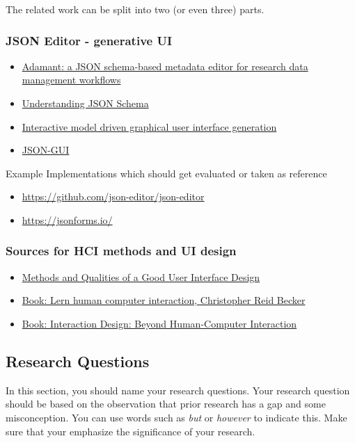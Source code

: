 The related work can be split into two (or even three) parts.

\subsubsection{JSON Editor - generative UI}

\begin{itemize}
	\item \href{https://f1000research.com/articles/11-475}{Adamant: a JSON schema-based metadata editor for research data management workflows}
	\item \href{https://json-schema.org/understanding-json-schema/UnderstandingJSONSchema.pdf}{Understanding JSON Schema}
	\item \href{https://www.researchgate.net/publication/220728636_Interactive_model_driven_graphical_user_interface_generation}{Interactive model driven graphical user interface generation }
	\item \href{https://www.sciencedirect.com/science/article/pii/S2352711018300505}{JSON-GUI}
\end{itemize}

Example Implementations which should get evaluated or taken as reference
\begin{itemize}
	\item \url{https://github.com/json-editor/json-editor}
	\item \url{https://jsonforms.io/}
\end{itemize}



\subsubsection{Sources for HCI methods and UI design}

\begin{itemize}
	\item \href{https://www.diva-portal.org/smash/get/diva2:215020/FULLTEXT01.pdf }{Methods and Qualities of a Good User Interface Design}
	\item \href{}{Book: Lern human computer interaction, Christopher Reid Becker}
	\item \href{}{Book: Interaction Design: Beyond Human-Computer Interaction }
\end{itemize}

\subsection{Research Questions}
\label{subsec:question}
In this section, you should name your research questions. Your research question should be based on the observation that prior research has a gap and some misconception. You can use words such as \emph{but} or \emph{however} to indicate this. Make sure that your emphasize the significance of your research. 